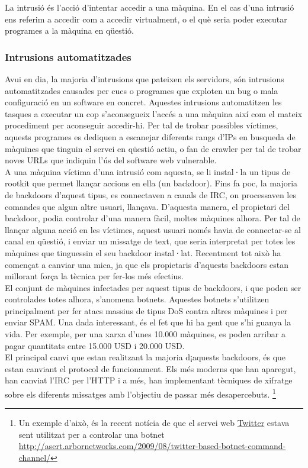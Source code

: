 La intrusió és l'acció d'intentar accedir a una màquina. En el cas d'una intrusió ens referim a accedir com a accedir 
virtualment, o el què seria poder executar programes a la màquina en qüestió.

\subsubsection{Intrusions automatitzades} 

Avui en dia, la majoria d'intrusions que pateixen els servidors, són intrusions automatitzades causades per cucs o 
programes que exploten un bug o mala configuració en un software en concret. Aquestes intrusions automatitzen les 
tasques a executar un cop s'aconsegueix l'accés a una màquina així com el mateix procediment per aconseguir accedir-hi. 
Per tal de trobar possibles víctimes, aquests programes
es dediquen a escanejar diferents rangs d'IPs en busqueda de màquines que tinguin el servei en qüestió actiu, o 
fan de crawler per tal de trobar noves URLs que indiquin l'ús del software web vulnerable. \\

A una màquina víctima d'una intrusió com aquesta, se li instal·la un tipus de rootkit que permet llançar accions en 
ella (un backdoor). Fins fa poc, la majoria de backdoors d'aquest tipus,  es connectaven a canals de IRC, on 
processaven les comandes que algun altre usuari, llançava. D'aquesta manera, el propietari del backdoor, podia controlar 
d'una manera fàcil, moltes màquines alhora. Per tal de llançar alguna acció en les víctimes, aquest usuari només havia de 
connectar-se al canal en qüestió, i 
enviar un missatge de text, que seria interpretat per totes les màquines que tinguessin el seu backdoor instal·lat. 
Recentment tot això ha començat a canviar una mica, ja que els propietaris d'aquests backdoors estan millorant força la tècnica
per fer-los més efectius. \\

El conjunt de màquines infectades per aquest tipus de backdoors, i que poden ser controlades totes alhora, s'anomena
botnets. Aquestes botnets s'utilitzen principalment per fer atacs massius de tipus DoS contra altres màquines i per enviar SPAM. 
Una dada interessant, és el fet que hi ha gent que s'hi guanya la vida. Per exemple, per una xarxa d'unes 10.000 màquines,
es poden arribar a pagar quantitats entre 15.000 USD i 20.000 USD. \\

El principal canvi que estan realitzant la majoria d¡aquests backdoors, és que estan canviant el protocol de funcionament. Els
més moderns que han aparegut, han canviat l'IRC per l'HTTP i a més, han implementant tècniques de xifratge sobre els diferents 
missatges amb l'objectiu de passar més desapercebuts. \footnote{Un exemple d'això, és la recent notícia de que el servei web 
\href{http://twitter.com/}{Twitter} estava sent utilitzat per a controlar una botnet \url{http://asert.arbornetworks.com/2009/08/twitter-based-botnet-command-channel/}} \\

